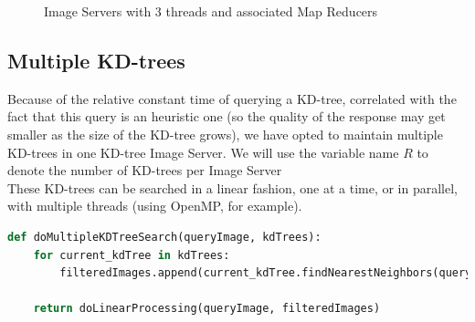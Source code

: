 \begin{figure}[ht!]
\centering
{}
\caption{Image Servers with 3 threads and associated Map Reducers}
\label{fig:threads}
\end{figure}

\subsection{Multiple KD-trees}

Because of the relative constant time of querying a KD-tree, correlated with the fact that this query is an heuristic one (so the quality of the response may get smaller as the size of the KD-tree grows), we have opted to maintain multiple KD-trees in one KD-tree Image Server. We will use the variable
name $R$ to denote the number of KD-trees per Image Server \\
These KD-trees can be searched in a linear fashion, one at a time, or in parallel, with multiple threads (using OpenMP, for example).\\

\begin{lstlisting}[language=python, caption=Multiple KD-Tree Image Server pseudocode]
def doMultipleKDTreeSearch(queryImage, kdTrees):
	for current_kdTree in kdTrees:
		filteredImages.append(current_kdTree.findNearestNeighbors(queryImage))
	
	return doLinearProcessing(queryImage, filteredImages)
\end{lstlisting}

